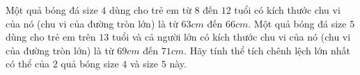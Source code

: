 \begin{ex}%
	Một quả bóng đá size $4$ dùng cho trẻ em từ $8$ đến $12$ tuổi có kích thước chu vi của nó (chu vi của đường tròn lớn) là từ $63cm$ đến $66cm$. Một quả bóng đá size $5$ dùng cho trẻ em trên $13$ tuổi và cả người lớn có kích thước chu vi của nó (chu vi của đường tròn lớn) là từ $69cm$ đến $71cm$. Hãy tính thể tích chênh lệch lớn nhất có thể của $2$ quả bóng size $4$ và size $5$ này.
\end{ex}
\begin{multicols}{10}
	 
\end{multicols}